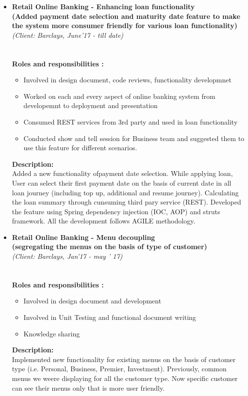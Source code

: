 \documentclass[a4paper,10pt]{article}
\newcommand{\isep}{-2 pt}
\begin{document}
\begin{itemize}
\item \textbf{Retail Online Banking - Enhancing loan functionality} \hspace{0.5cm}
{}\\
\textbf {(Added payment date selection and maturity date feature to make the system more consumer friendly for various loan functionality)}\\
 \emph{(Client: Barclays, June'17 - till date)} \\[-0.6cm]\\\\
\textbf {Roles and responsibilities :}
	\begin{itemize}\itemsep \isep
	\item Involved in design document, code reviews, functionality developmnet
	\item Worked on each and every aspect of online banking system from developemnt to deployment and presentation
	\item Consumed REST services from 3rd party and used in loan functionality
	\item Conducted show and tell session for Business team and suggested them to use this feature for different scenarios.

	\end{itemize} 
\textbf {Description:}\\ Added a new functionality ofpayment date selection. While applying loan, User can select their first payment date on the basis of current date in all loan journey (including top up, additional and resume journey). Calculating the loan summary through cunsuming third pary service (REST).
Developed the feature using Spring dependency injection (IOC, AOP) and struts framework. All the development follows AGILE methodology.  

\item \textbf{Retail Online Banking - Menu decoupling } \hspace {0.5cm}
{}\\
\textbf {(segregating the menus on the basis of type of customer)}\\
 \emph{(Client: Barclays, Jan'17 - may ' 17)} \\[-0.6cm]\\\\
\textbf {Roles and responsibilities :}
	\begin{itemize}\itemsep \isep
	\item Involved in design document and development
	\item Involved in Unit Testing and functional document writing
	\item Knowledge sharing 
\end{itemize} 	
\textbf {Description: } \\ Implemented new functionality for existing menus on the basis of customer type (i.e. Personal, Business, Premier, Investment). Previously, common menus we weere displaying for all the customer type. Now specific customer can see their menus only that is more user friendly.


\end{itemize}
\end{document}
